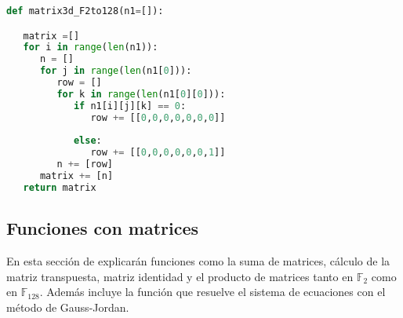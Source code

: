 \begin{table}[H]
	\begin{center}
	\centering
	\end{center}
	\caption{Parámetros de la función \texttt{matrix3d\_F2to128}}
\end{table}

\vspace{0.25cm}

\begin{lstlisting}[language=Python,caption=Vector de matrices de $\mathds{F}_2$ a una matriz de $\mathds{F}_{128}$, label=cod:matriz3dF2-cuerpo]
def matrix3d_F2to128(n1=[]):

   matrix =[]
   for i in range(len(n1)):
      n = []
      for j in range(len(n1[0])):
         row = []
         for k in range(len(n1[0][0])):
            if n1[i][j][k] == 0:
               row += [[0,0,0,0,0,0,0]]
               
            else:
               row += [[0,0,0,0,0,0,1]]
         n += [row]
      matrix += [n]
   return matrix
\end{lstlisting}

\subsection{Funciones con matrices}

En esta sección de explicarán funciones como la suma de matrices, cálculo de la matriz transpuesta, matriz identidad y el producto de matrices tanto en $\mathds{F}_2$ como en $\mathds{F}_{128}$. Además incluye la función que resuelve el sistema de ecuaciones con el método de Gauss-Jordan.\\



